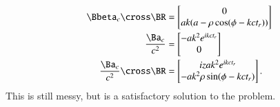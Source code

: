 {\begin{equation}
\begin{aligned}
\Bbeta_c \cross \BR
&=
\begin{bmatrix}
0 \\
a k ( a - \rho \cos(\phi -  k c t_r) )
\end{bmatrix} \\
\frac{\Ba_c}{c^2} &=
\begin{bmatrix}
- a k^2 e^{i k c t_r} \\
0
\end{bmatrix} \\
\frac{\Ba_c}{c^2} \cross \BR
&=
\begin{bmatrix}
i z a k^2 e^{i k c t_r} \\
- a k^2 \rho \sin(\phi -  k c t_r)
\end{bmatrix}.
\end{aligned}
\end{equation}
%
This is still messy, but is a satisfactory solution to the problem.

}
